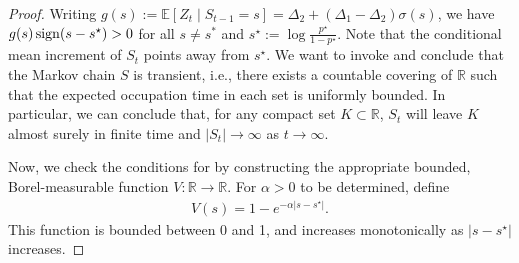 \documentclass[12pt]{article}
\newcommand{\E}{\mathbb{E}}
\begin{document}
\begin{proof}
Writing $g(s):=\E[Z_t\mid S_{t-1}=s]=\Delta_{2}+(\Delta_{1}-\Delta_{2})\sigma(s)$, we have $g(s)\,{\rm sign}(s-s^\star) > 0$ for all $s \neq s^*$ and $s^\star:=\log\!\tfrac{p^{\star}}{1-p^{\star}}$.
Note that the conditional mean increment of $S_t$ points away from $s^\star$.
We want to invoke \citet[Theorem 8.4.2]{meynMarkovChainsStochastic1993} and conclude that the Markov chain $S$ is transient, i.e., there exists a countable covering of $\mathbb R$ such that the expected occupation time in each set is uniformly bounded.
In particular, we can conclude that, for any compact set $K \subset \mathbb R$, $S_t$ will leave $K$ almost surely in finite time and $|S_t| \to \infty$ as $t \to \infty$.

Now, we check the conditions for \citet[Theorem 8.4.2]{meynMarkovChainsStochastic1993} by constructing the appropriate bounded, Borel-measurable function $V: \mathbb R \to \mathbb R$.
For $\alpha > 0$ to be determined, define
\begin{align*}
    V(s) = 1 - e^{-\alpha |s - s^\star|}.
\end{align*}
This function is bounded between 0 and 1, and increases monotonically as $|s - s^\star|$ increases.


\end{proof}
\end{document}
